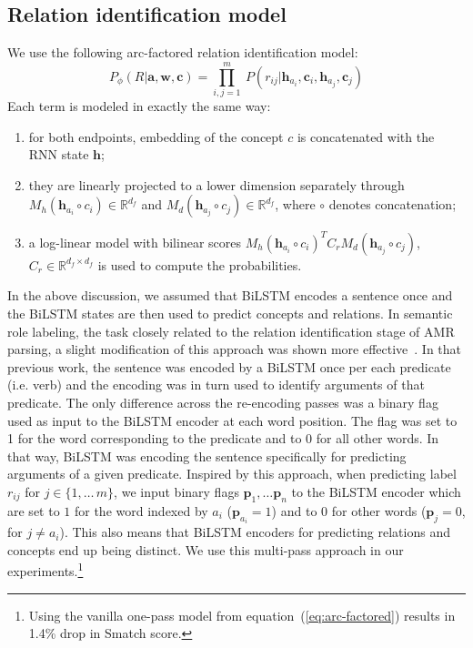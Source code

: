 \documentclass[11pt,a4paper]{article}
\begin{document}
\subsection{Relation identification model}
\label{sect:rel-mod}

We use the following arc-factored relation identification model:
\begin{equation}
\label{eq:arc-factored}
P_\phi(R | \mathbf{a}, \mathbf{w}, \mathbf{c}) = \prod_{i,j=1}^{m}{\!\ P(r_{ij} | \mathbf{h}_{a_i},\! \mathbf{c}_i,\! \mathbf{h}_{a_j},\!\mathbf{c}_j)} 
\end{equation}
Each term is modeled in exactly the same way: 
\begin{enumerate}
\item for both endpoints, embedding of the concept $c$ is concatenated with the RNN state $\mathbf{h}$; 
\item they are linearly projected to a lower dimension separately through $M_{h}(\mathbf{h}_{a_i} \circ c_i) \in \mathbb{R}^{d_f}$ and $M_{d}(\mathbf{h}_{a_j}  \circ c_j)  \in \mathbb{R}^{d_f}$, where $\circ$ denotes concatenation; 
\item a log-linear 
model with bilinear scores $M_{h}(\mathbf{h}_{a_i} \circ c_i)^T C_r M_{d}(\mathbf{h}_{a_j}  \circ c_j)$, $C_r \in \mathbb{R}^{d_f \times d_f}$
is used to compute the probabilities.
\end{enumerate}

In the above discussion, we assumed that BiLSTM 
encodes a sentence once and the BiLSTM states are then used to predict concepts and relations. In semantic role labeling, the task
closely related to the relation identification stage of AMR parsing, a slight modification of this approach was shown more effective~\cite{zhou2015end,marcheggiani-frolov-titov:2017:CoNLL}. In that previous work, the sentence was encoded by a BiLSTM once per each predicate (i.e. verb) and the encoding was in turn used to identify arguments of that predicate. The only difference across the re-encoding passes was 
a binary flag used as input to the BiLSTM encoder at each word position. The flag was set to 1 for the word corresponding to the predicate and to 0 for all other words. In that way, BiLSTM was encoding the sentence specifically for predicting arguments of a given predicate.
Inspired by this approach, when predicting label $r_{ij}$ for $j \in \{1,\ldots\,m\}$, we input binary flags $\mathbf{p}_1, \ldots \mathbf{p}_n$ to the BiLSTM encoder which are set to $1$ for the word indexed by $a_i$ ($\mathbf{p}_{a_i} = 1$) and to $0$ for other words ($\mathbf{p}_{j} = 0$, for $j \neq a_i$). 
This also means that BiLSTM encoders for predicting relations and concepts end up being distinct. 
We use this multi-pass approach in our experiments.\footnote{Using the vanilla one-pass model from equation~(\ref{eq:arc-factored}) results in 1.4\% drop in Smatch score.}
\end{document}
